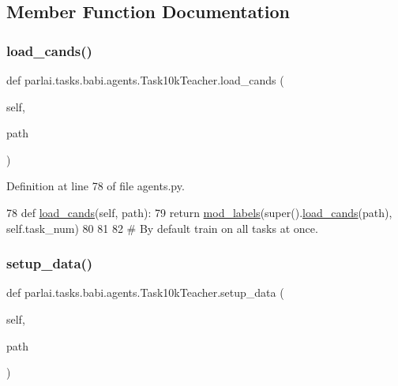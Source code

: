 \subsection{Member Function Documentation}
\mbox{\label{classparlai_1_1tasks_1_1babi_1_1agents_1_1Task10kTeacher_af80438ce3c1fa375e4dbed775afb9ed2}} 
\subsubsection{\texorpdfstring{load\+\_\+cands()}{load\_cands()}}
{\footnotesize\ttfamily def parlai.\+tasks.\+babi.\+agents.\+Task10k\+Teacher.\+load\+\_\+cands (\begin{DoxyParamCaption}\item[{}]{self,  }\item[{}]{path }\end{DoxyParamCaption})}



Definition at line 78 of file agents.\+py.


\begin{DoxyCode}
78     \textcolor{keyword}{def }\hyperlink{namespaceparlai_1_1utils_1_1misc_ad935ab0a9d49b897c5e3efdbe1c46c4d}{load\_cands}(self, path):
79         \textcolor{keywordflow}{return} \hyperlink{namespaceparlai_1_1tasks_1_1babi_1_1agents_a80ee701751bc608fcb01bcfb1e884de0}{mod\_labels}(super().\hyperlink{namespaceparlai_1_1utils_1_1misc_ad935ab0a9d49b897c5e3efdbe1c46c4d}{load\_cands}(path), self.task\_num)
80 
81 
82 \textcolor{comment}{# By default train on all tasks at once.}
\end{DoxyCode}
\mbox{\label{classparlai_1_1tasks_1_1babi_1_1agents_1_1Task10kTeacher_a658de67a884d117c04f54e3f9d4bec4a}} 
\subsubsection{\texorpdfstring{setup\+\_\+data()}{setup\_data()}}
{\footnotesize\ttfamily def parlai.\+tasks.\+babi.\+agents.\+Task10k\+Teacher.\+setup\+\_\+data (\begin{DoxyParamCaption}\item[{}]{self,  }\item[{}]{path }\end{DoxyParamCaption})}



